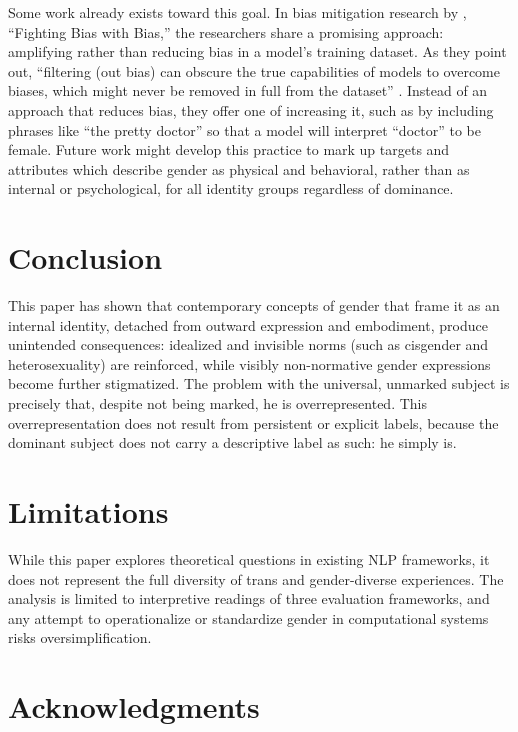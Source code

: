 \documentclass[11pt]{article}
\begin{document}
Some work already exists toward this goal. In bias mitigation research by \citet{reif:2023}, “Fighting Bias with Bias,” the researchers share a promising approach: amplifying rather than reducing bias in a model’s training dataset. As they point out, “filtering (out bias) can obscure the true capabilities of models to overcome biases, which might never be removed in full from the dataset” \citep{reif:2023}. Instead of an approach that reduces bias, they offer one of increasing it, such as by including phrases like “the pretty doctor” so that a model will interpret “doctor” to be female. Future work might develop this practice to mark up targets and attributes which describe gender as physical and behavioral, rather than as internal or psychological, for all identity groups regardless of dominance.

\section{Conclusion}
This paper has shown that contemporary concepts of gender that frame it as an internal identity, detached from outward expression and embodiment, produce unintended consequences: idealized and invisible norms (such as cisgender and heterosexuality) are reinforced, while visibly non-normative gender expressions become further stigmatized. The problem with the universal, unmarked subject is precisely that, despite not being marked, he is overrepresented. This overrepresentation does not result from persistent or explicit labels, because the dominant subject does not carry a descriptive label as such: he simply is.


\section*{Limitations}

While this paper explores theoretical questions in existing NLP frameworks, it does not represent the full diversity of trans and gender-diverse experiences. The analysis is limited to interpretive readings of three evaluation frameworks, and any attempt to operationalize or standardize gender in computational systems risks oversimplification.

\section*{Acknowledgments}

%


\end{document}
